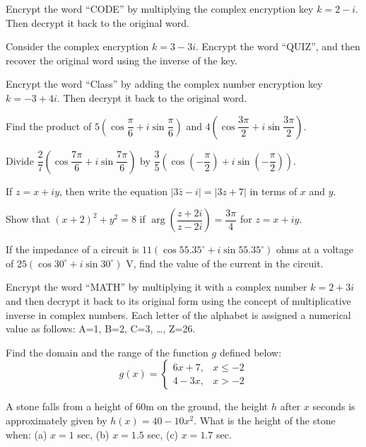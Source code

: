 \documentclass[11pt,a4paper]{article}
\begin{document}
\begin{longlist}
\item Encrypt the word ``CODE'' by multiplying the complex encryption key $k=2-i$. Then decrypt it back to the original word.

\item Consider the complex encryption $k=3-3i$. Encrypt the word ``QUIZ'', and then recover the original word using the inverse of the key.

\item Encrypt the word ``Class'' by adding the complex number encryption key $k=-3+4i$. Then decrypt it back to the original word.

\item Find the product of $5\left(\cos\dfrac{\pi}{6}+i\sin\dfrac{\pi}{6}\right)$ and $4\left(\cos\dfrac{3\pi}{2}+i\sin\dfrac{3\pi}{2}\right)$.

\item Divide $\dfrac{2}{7}\left(\cos\dfrac{7\pi}{6}+i\sin\dfrac{7\pi}{6}\right)$ by $\dfrac{3}{5}\left(\cos\left(-\dfrac{\pi}{2}\right)+i\sin\left(-\dfrac{\pi}{2}\right)\right)$.

\item If $z=x+iy$, then write the equation $|3\bar{z}-i|=|3z+7|$ in terms of $x$ and $y$.

\item Show that $(x+2)^2+y^2=8$ if $\arg\left(\dfrac{z+2i}{z-2i}\right)=\dfrac{3\pi}{4}$ for $z=x+iy$.

\item If the impedance of a circuit is $11(\cos 55.35^\circ+i\sin 55.35^\circ)$ ohms at a voltage of $25(\cos 30^\circ+i\sin 30^\circ)$ V, find the value of the current in the circuit.

\item Encrypt the word ``MATH'' by multiplying it with a complex number $k=2+3i$ and then decrypt it back to its original form using the concept of multiplicative inverse in complex numbers. Each letter of the alphabet is assigned a numerical value as follows: A=1, B=2, C=3, \ldots, Z=26.

\item Find the domain and the range of the function $g$ defined below:
\[
g(x)=\begin{cases}6x+7, & x\leq -2\\ 4-3x, & x>-2\end{cases}
\]

\item A stone falls from a height of $60$m on the ground, the height $h$ after $x$ seconds is approximately given by $h(x)=40-10x^2$. What is the height of the stone when: (a) $x=1$ sec, (b) $x=1.5$ sec, (c) $x=1.7$ sec.


\end{longlist}
\end{document}
